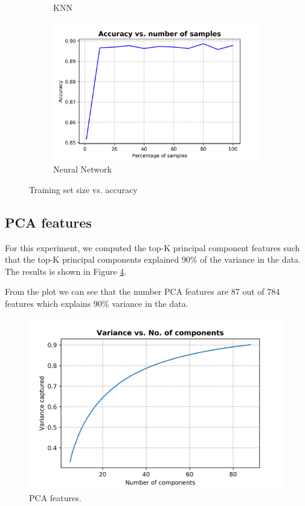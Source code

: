 \documentclass[10pt]{scrartcl}
\begin{document}
\begin{figure}[H]
\begin{subfigure}{0.35\linewidth}
		\caption{KNN}\label{fig:1b}
	\end{subfigure}
	\begin{subfigure}{0.4\linewidth}
		\centering
		\includegraphics[width=1\linewidth]{figures/accuracy_vs_samples_neural_net_tuned.png}
		\caption{Neural Network}\label{fig:1b}
	\end{subfigure}
	\caption{Training set size vs. accuracy}\label{fig:1}
\end{figure}

\subsection*{PCA features}
For this experiment, we computed the top-K principal component features such that the top-K principal components explained 90\% of the variance in the data. 
The results is shown in Figure \ref{fig:pca_features}.

From the plot we can see that the number PCA features are 87 out of 784 features which explains 90\% variance in the data.
\begin{figure}[H]
\centering
\includegraphics[width=0.5\linewidth]{figures/pca_variance_vs_no_comp.png}
\caption{PCA features. \label{fig:pca_features}}
\end{figure}
\end{document}
